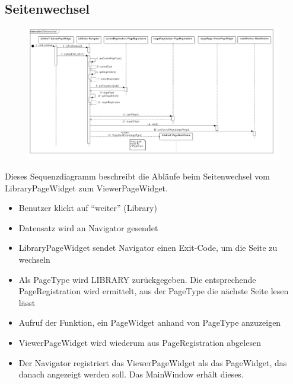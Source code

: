 \subsection{Seitenwechsel}

\begin{figure}[H]
\centering
\includegraphics[width=\linewidth]{img/Sequenzdiagramme/Seitenwechsel}
\label{fig:seitenwechsel}
\end{figure}

Dieses Sequenzdiagramm beschreibt die Abläufe beim Seitenwechsel vom LibraryPageWidget zum ViewerPageWidget.

\begin{itemize}
	\item Benutzer klickt auf \enquote{weiter} (Library)

	\item Datensatz wird an Navigator gesendet

	\item LibraryPageWidget sendet Navigator einen Exit-Code, um die Seite zu wechseln

	\item Als PageType wird LIBRARY zurückgegeben. Die entsprechende PageRegistration wird ermittelt, aus der PageType die nächste Seite lesen lässt

	\item Aufruf der Funktion, ein PageWidget anhand von PageType anzuzeigen

	\item ViewerPageWidget wird wiederum aus PageRegistration abgelesen

	\item Der Navigator registriert das ViewerPageWidget als das PageWidget, das danach angezeigt werden soll. Das MainWindow erhält dieses.

\end{itemize}

